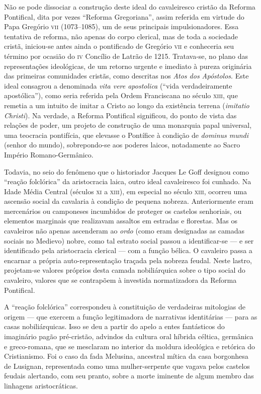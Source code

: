 Não se pode dissociar a construção deste ideal do cavaleiresco cristão
da Reforma Pontifical, dita por vezes “Reforma Gregoriana”, assim
referida em virtude do Papa Gregório \textsc{vii} (1073--1085), um de seus
principais impulsionadores. Essa tentativa de reforma, não apenas do
corpo clerical, mas de toda a sociedade cristã, iniciou-se antes ainda
o pontificado de Gregório \textsc{vii} e conheceria seu término por ocasião do
\textsc{iv} Concílio de Latrão de 1215. Tratava-se, no plano das representações
ideológicas, de um retorno urgente e imediato à pureza originária das
primeiras comunidades cristãs, como descritas nos \textit{Atos dos
Apóstolos}. Este ideal consagrou a denominada \textit{vita vere
apostolica} (“vida verdadeiramente apostólica”), como seria referida
pela Ordem Franciscana no século \textsc{xiii}, que remetia a um intuito de
imitar a Cristo ao longo da existência terrena (\textit{imitatio
Christi}). Na verdade, a Reforma Pontifical significou, do ponto de
vista das relações de poder, um projeto de construção de uma monarquia
papal universal, uma teocracia pontifícia, que elevasse o Pontífice à
condição de \textit{dominus mundi} (senhor do mundo), sobrepondo-se aos
poderes laicos, notadamente ao Sacro Império Romano-Germânico. 

Todavia, no seio do fenômeno que o historiador Jacques Le Goff designou
como “reação folclórica” da aristocracia laica, outro ideal
cavaleiresco foi cunhado. Na Idade Média Central (séculos \textsc{xi} a \textsc{xiii}),
em especial no século \textsc{xiii}, ocorreu uma ascensão social da cavalaria à
condição de pequena nobreza. Anteriormente eram mercenários ou
camponeses incumbidos de proteger os castelos senhoriais, ou elementos
marginais que realizavam assaltos em estradas e florestas. Mas os
cavaleiros não apenas ascenderam ao \textit{ordo} (como eram designadas
as camadas sociais no Medievo) nobre, como tal estrato social passou a
identificar-se --- e ser identificado pela aristocracia clerical --- com a
função bélica. O cavaleiro passa a encarnar a própria
auto-representação traçada pela nobreza feudal. Neste lastro,
projetam-se valores próprios desta camada nobiliárquica sobre o tipo
social do cavaleiro, valores que se contrapõem à investida
normatizadora da Reforma Pontifical. 

A “reação folclórica” correspondeu à constituição de verdadeiras
mitologias de origem --- que exercem a função legitimadora de narrativas
identitárias --- para as casas nobiliárquicas. Isso se deu a partir do
apelo a entes fantásticos do imaginário pagão pré-cristão, advindos da
cultura oral híbrida céltica, germânica e greco-romana, que se
mesclaram no interior da moldura ideológica e retórica do Cristianismo.
Foi o caso da fada Melusina, ancestral mítica da casa borgonhesa de
Lusignan, representada como uma mulher-serpente que vagava pelos
castelos feudais alertando, com seu pranto, sobre a morte iminente de
algum membro das linhagens aristocráticas. 

